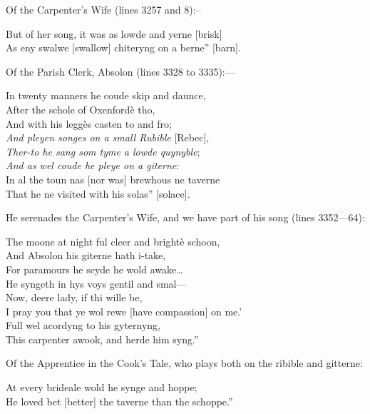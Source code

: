Of the Carpenter’s Wife (lines 3257 and 8):--
\begin{scverse}But of her song, it was as lowde and yerne [brisk]\\
As eny swalwe [swallow] chiteryng on a berne” [barn].
\end{scverse}
Of the Parish Clerk, Absolon (lines 3328 to 3335):—
\begin{scverse}In twenty manners he coude skip and daunce,\\
After the schole of Oxenfordè tho,\\
And with his leggès casten to and fro;\\
\textit{And pleyen songes on a small Rubible} [Rebec],\\
\textit{Ther-to he sang som tyme a lowde quynyble};\\
\textit{And as wel coude he pleye on a giterne}:\\
In al the toun nas [nor was] brewhous ne taverne\\
That he ne visited with his solas” [solace].
\end{scverse}
He serenades the Carpenter’s Wife, and we have part of his song (lines 3352—64):%
\begin{scverse}The moone at night ful cleer and brightè schoon,\\
And Absolon his giterne hath i-take,\\
For paramours he seyde he wold awake\ldots \\
He syngeth in hys voys gentil and smal—\\
Now, deere lady, if thi wille be,\\
I pray you that ye wol rewe [have compassion] on me.’\\
Full wel acordyng to his gyternyng,\\
This carpenter awook, and herde him syng.”
\end{scverse}
Of the Apprentice in the Cook’s Tale, who plays both on the ribible and gitterne:
\begin{scverse}At every brideale wold he synge and hoppe;\\
He loved bet [better] the taverne than the schoppe.”
\end{scverse}
\pagebreak

